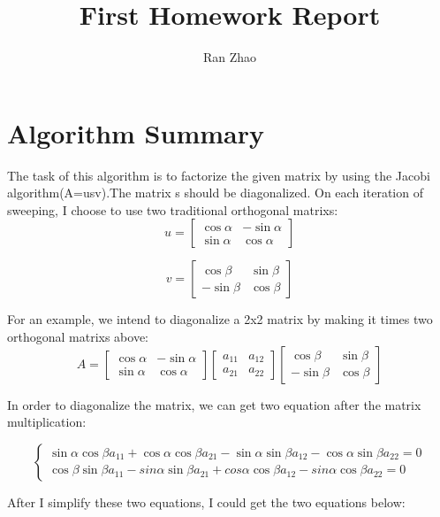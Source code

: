\documentclass[12pts]{article}
\begin{document}
\author{Ran Zhao}
\title{First Homework Report}
\maketitle
\section{Algorithm Summary}

	The task of this algorithm is to factorize the given matrix by using the Jacobi algorithm(A=usv).The matrix s should be diagonalized. On each iteration of sweeping, I choose to use two traditional orthogonal matrixs:
\[
 u = \begin{bmatrix}
       \cos\alpha& -\sin\alpha \\
       \sin\alpha & \cos\alpha 
       \end{bmatrix}
\]

\[
 v = \begin{bmatrix}
       \cos\beta& \sin\beta \\
       -\sin\beta & \cos\beta 
       \end{bmatrix}
\]

For an example, we intend to diagonalize a 2x2 matrix by making it times two orthogonal matrixs above:
\[
 A = \begin{bmatrix} \cos\alpha& -\sin\alpha \\ \sin\alpha & \cos\alpha \end{bmatrix}
	\begin{bmatrix}a_{11}& a_12\\a_21&a_22\end{bmatrix}
	\begin{bmatrix}\cos\beta& \sin\beta \\-\sin\beta & \cos\beta\end{bmatrix}
\]

In order to diagonalize the matrix, we can get two equation after the matrix multiplication:

$$
\left\{\begin{array}{c}
	\sin\alpha\cos\beta a_{11}+\cos\alpha\cos\beta a_{21}-\sin\alpha\sin\beta a_{12}-\cos\alpha\sin\beta a_{22}=0\\
	\cos\beta\sin\beta a_{11}-sin\alpha\sin\beta a_{21}+cos\alpha\cos\beta a_{12}-sin\alpha\cos\beta a_{22}=0
	   \end{array}\right.
$$

After I simplify these two equations, I could get the two equations below:
\end{document}
